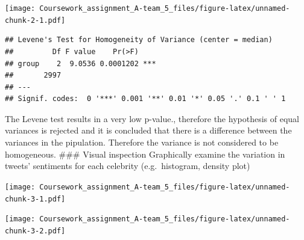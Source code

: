 \documentclass[]{article}
\newenvironment{Shaded}{\begin{snugshade}}{\end{snugshade}}
\newcommand{\KeywordTok}[1]{\textcolor[rgb]{0.13,0.29,0.53}{\textbf{#1}}}
\newcommand{\DataTypeTok}[1]{\textcolor[rgb]{0.13,0.29,0.53}{#1}}
\newcommand{\CommentTok}[1]{\textcolor[rgb]{0.56,0.35,0.01}{\textit{#1}}}
\newcommand{\OperatorTok}[1]{\textcolor[rgb]{0.81,0.36,0.00}{\textbf{#1}}}
\newcommand{\NormalTok}[1]{#1}
\begin{document}
\texttt{[image: Coursework\_assignment\_A-team\_5\_files/figure-latex/unnamed-chunk-2-1.pdf]}

\begin{Shaded}
\end{Shaded}

\begin{verbatim}
## Levene's Test for Homogeneity of Variance (center = median)
##         Df F value    Pr(>F)    
## group    2  9.0536 0.0001202 ***
##       2997                      
## ---
## Signif. codes:  0 '***' 0.001 '**' 0.01 '*' 0.05 '.' 0.1 ' ' 1
\end{verbatim}

The Levene test results in a very low p-value., therefore the hypothesis
of equal variances is rejected and it is concluded that there is a
difference between the variances in the pipulation. Therefore the
variance is not considered to be homogeneous. \#\#\# Visual inspection
Graphically examine the variation in tweets' sentiments for each
celebrity (e.g.~histogram, density plot)

\begin{Shaded}
\end{Shaded}

\texttt{[image: Coursework\_assignment\_A-team\_5\_files/figure-latex/unnamed-chunk-3-1.pdf]}

\begin{Shaded}
\end{Shaded}

\texttt{[image: Coursework\_assignment\_A-team\_5\_files/figure-latex/unnamed-chunk-3-2.pdf]}

\begin{Shaded}
\end{Shaded}
\end{document}
